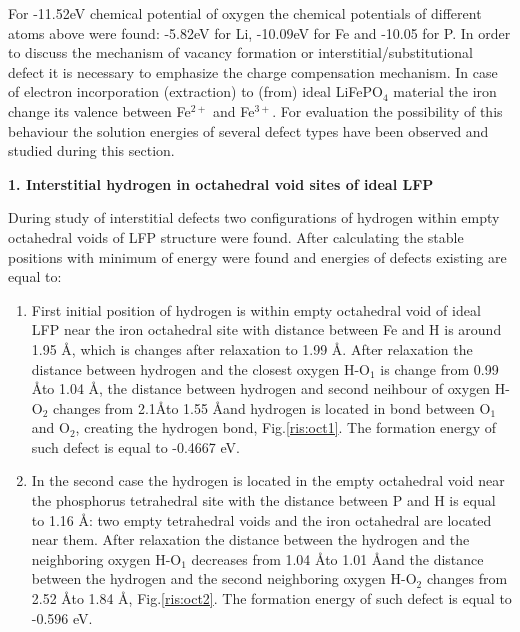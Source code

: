 For -11.52eV chemical potential of oxygen the chemical potentials of different atoms above were found: -5.82eV for Li, -10.09eV for Fe and -10.05 for P. In order to discuss the mechanism of vacancy formation or interstitial/substitutional defect it is necessary to emphasize the charge compensation mechanism. In case of electron incorporation (extraction) to (from) ideal LiFePO$_4$ material the iron change its valence between Fe$^{2+}$ and Fe$^{3+}$. For evaluation the possibility of this behaviour the solution energies of several defect types have been observed and studied during this section.

\textbf{1. Interstitial hydrogen in octahedral void sites of ideal LFP}

During study of interstitial defects two configurations of hydrogen within empty octahedral voids of LFP structure were found.  After calculating the stable positions with minimum of energy were found and energies of defects existing are equal to:
\begin{enumerate}
	\item First initial position of hydrogen is within empty octahedral void of ideal LFP near the iron octahedral site with distance between Fe and H is around 1.95 \AA, which is changes after relaxation to 1.99 \AA. After relaxation the distance between hydrogen and the closest oxygen H-O$_1$ is change from 0.99 \AA to 1.04 \AA, the distance between hydrogen and second neihbour of oxygen H-O$_2$ changes from 2.1\AA to 1.55 \AA and hydrogen is located in bond between O$_1$ and O$_2$, creating the hydrogen bond, Fig.\ref{ris:oct1}. The formation energy of such defect is equal to -0.4667 eV.
	\item In the second case the hydrogen is located in the empty octahedral void near the phosphorus tetrahedral site with the distance between P and H is equal to 1.16 \AA: two empty tetrahedral voids and the iron octahedral are located near them. After relaxation the distance between the hydrogen and the neighboring oxygen H-O$_1$ decreases from 1.04 \AA to 1.01 \AA and the distance between the hydrogen and the second neighboring oxygen H-O$_2$ changes from 2.52 \AA to 1.84 \AA, Fig.\ref{ris:oct2}. The formation energy of such defect is equal to -0.596 eV.
\end{enumerate}

